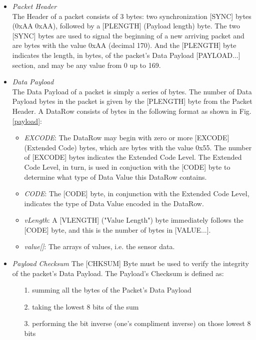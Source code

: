 \documentclass[conference]{IEEEtran}
\begin{document}
\begin{itemize}
	\item \textit{Packet Header}\\
	The Header of a packet consists of 3 bytes: two synchronization [SYNC] bytes (0xAA 0xAA), followed by a [PLENGTH] (Payload length) byte. The two [SYNC] bytes are used to signal the beginning of a new arriving packet and are bytes with the value 0xAA (decimal 170). And the [PLENGTH] byte indicates the length, in bytes, of the packet's Data Payload [PAYLOAD...] section, and may be any value from 0 up to 169.
	\item \textit{Data Payload}\\
	The Data Payload of a packet is simply a series of bytes. The number of Data Payload bytes in the packet is given by the [PLENGTH] byte from the Packet Header. A DataRow consists of bytes in the following format as shown in Fig. \ref{payload}:
	
	\begin{itemize}
		\item \textit{EXCODE}: The DataRow may begin with zero or more [EXCODE] (Extended Code) bytes, which are bytes with the value 0x55. The number of [EXCODE] bytes indicates the Extended Code Level. The Extended Code Level, in turn, is used in conjuction with the [CODE] byte to determine what type of Data Value this DataRow contains.

		\item \textit{CODE}: The [CODE] byte, in conjunction with the Extended Code Level, indicates the type of Data Value encoded in the DataRow.

		\item \textit{vLength}: A [VLENGTH] ("Value Length") byte immediately follows the [CODE] byte, and this is the number of bytes in [VALUE...].

		\item \textit{value[]}: The arrays of values, i.e. the sensor data.
	
	\end{itemize}

	\item \textit{Payload Checksum}
	The [CHKSUM] Byte must be used to verify the integrity of the packet's Data Payload. The Payload's Checksum is defined as:

	\begin{itemize}
		\item[1.] summing all the bytes of the Packet's Data Payload

		\item[2.] taking the lowest 8 bits of the sum

		\item[3.] performing the bit inverse (one's compliment inverse) on those lowest 8 bits
	
	\end{itemize}

\end{itemize}
\end{document}
